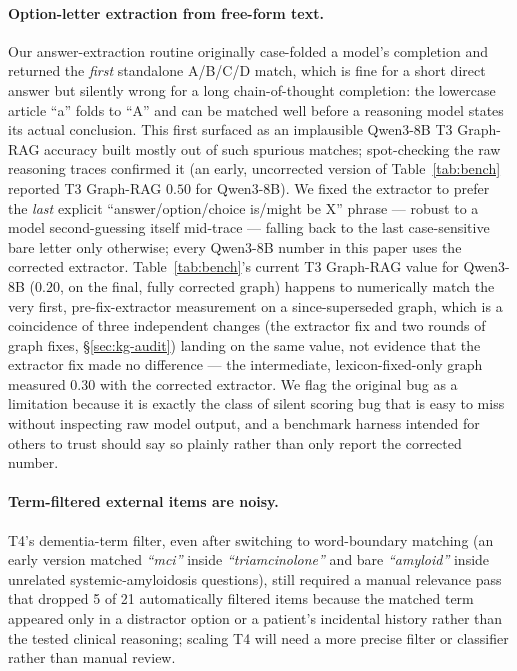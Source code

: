 \documentclass{article}
\begin{document}
\paragraph{Option-letter extraction from free-form text.} Our answer-extraction routine originally case-folded a model's completion and returned the \emph{first} standalone A/B/C/D match, which is fine for a short direct answer but silently wrong for a long chain-of-thought completion: the lowercase article ``a'' folds to ``A'' and can be matched well before a reasoning model states its actual conclusion. This first surfaced as an implausible Qwen3-8B T3 Graph-RAG accuracy built mostly out of such spurious matches; spot-checking the raw reasoning traces confirmed it (an early, uncorrected version of Table~\ref{tab:bench} reported T3 Graph-RAG $0.50$ for Qwen3-8B). We fixed the extractor to prefer the \emph{last} explicit ``answer/option/choice is/might be X'' phrase --- robust to a model second-guessing itself mid-trace --- falling back to the last case-sensitive bare letter only otherwise; every Qwen3-8B number in this paper uses the corrected extractor. Table~\ref{tab:bench}'s current T3 Graph-RAG value for Qwen3-8B ($0.20$, on the final, fully corrected graph) happens to numerically match the very first, pre-fix-extractor measurement on a since-superseded graph, which is a coincidence of three independent changes (the extractor fix and two rounds of graph fixes, \S\ref{sec:kg-audit}) landing on the same value, not evidence that the extractor fix made no difference --- the intermediate, lexicon-fixed-only graph measured $0.30$ with the corrected extractor. We flag the original bug as a limitation because it is exactly the class of silent scoring bug that is easy to miss without inspecting raw model output, and a benchmark harness intended for others to trust should say so plainly rather than only report the corrected number.
\paragraph{Term-filtered external items are noisy.} T4's dementia-term filter, even after switching to word-boundary matching (an early version matched \emph{``mci''} inside \emph{``triamcinolone''} and bare \emph{``amyloid''} inside unrelated systemic-amyloidosis questions), still required a manual relevance pass that dropped 5 of 21 automatically filtered items because the matched term appeared only in a distractor option or a patient's incidental history rather than the tested clinical reasoning; scaling T4 will need a more precise filter or classifier rather than manual review.
\end{document}
